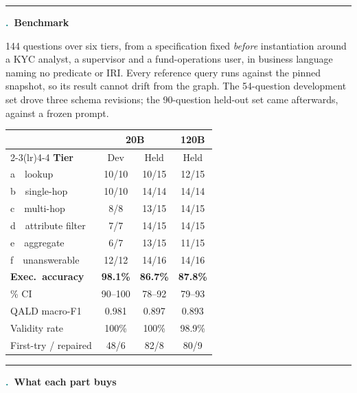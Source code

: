 \documentclass{article}
\renewcommand{\arraystretch}{1.35}
\newcommand{\HeadF}{\fontsize{38}{46}\selectfont\bfseries}
\newcommand{\BodyF}{\fontsize{26}{36}\selectfont}
\newcommand{\SmallF}{\fontsize{22}{30}\selectfont}
\newcommand{\TabF}{\fontsize{24}{32}\selectfont}
\newcounter{sec}
\newcommand{\heading}[1]{%
  \vspace{1mm}%
  {\color{teal}\rule{\linewidth}{2.4pt}}\par\vspace{2mm}%
  \stepcounter{sec}%
  {\HeadF\textcolor{teal}{\thesec.}~#1\par}\vspace{-2mm}}
\newcommand{\abbar}[4]{%
  \node[anchor=south west, font=\SmallF, text=ink] at (0,#1+5.5) {#3};
  \draw[fill=#4, draw=none] (0,#1) rectangle (#2,#1+5);
  \node[anchor=west, font=\SmallF\bfseries, text=ink] at (#2+2,#1+2.5) {#2\%};
}
\newcommand{\baraxis}{%
  \draw[rulec] (0,-4) -- (100,-4);
  \node[anchor=north, font=\SmallF, text=muted] at (0,-4) {0};
  \node[anchor=north, font=\SmallF, text=muted] at (50,-4) {50};
  \node[anchor=north, font=\SmallF, text=muted] at (100,-4) {100\%};
}
\newlength{\colw}
\begin{document}
\begin{minipage}[t]{\colw}
\BodyF

\vspace{\wtreserve}
\heading{Benchmark}

144 questions over six tiers, from a specification fixed \emph{before}
instantiation around a KYC analyst, a supervisor and a fund-operations user, in
business language naming no predicate or IRI. Every reference query runs against
the pinned snapshot, so its result cannot drift from the graph. The 54-question
development set drove three schema revisions; the 90-question held-out set came
afterwards, against a frozen prompt.

\vspace{1mm}
\begin{center}{\renewcommand{\arraystretch}{1.15}\TabF
\begin{tabular}{@{}lccc@{}}
\toprule
 & \multicolumn{2}{c}{\textbf{20B}} & \textbf{120B} \\
\cmidrule(lr){2-3}\cmidrule(lr){4-4}
\textbf{Tier} & Dev & Held & Held \\
\midrule
a\ \ lookup           & 10/10 & 10/15 & 12/15 \\
b\ \ single-hop       & 10/10 & 14/14 & 14/14 \\
c\ \ multi-hop        & 8/8   & 13/15 & 14/15 \\
d\ \ attribute filter & 7/7   & 14/15 & 14/15 \\
e\ \ aggregate        & 6/7   & 13/15 & 11/15 \\
f\ \ unanswerable     & 12/12 & 14/16 & 14/16 \\
\midrule
\textbf{Exec.\ accuracy}  & \textbf{98.1\%} & \textbf{86.7\%} & \textbf{87.8\%} \\
\quad 95\% CI             & 90--100 & 78--92 & 79--93 \\
QALD macro-F1             & 0.981 & 0.897 & 0.893 \\
Validity rate             & 100\% & 100\% & 98.9\% \\
First-try / repaired      & 48/6 & 82/8 & 80/9 \\
\bottomrule
\end{tabular}}
\end{center}

\heading{What each part buys}

\vspace{1mm}
\begin{center}
\end{center}


\end{minipage}
\end{document}
